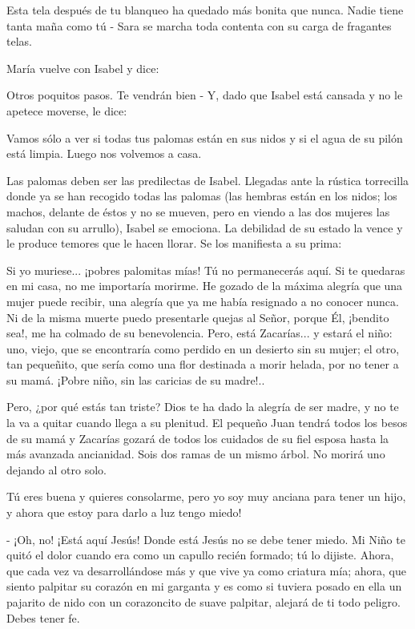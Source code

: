 \documentclass[12pt]{book} %
\begin{document}
Esta tela después de tu blanqueo ha quedado más bonita que nunca. Nadie tiene tanta maña como tú - Sara se marcha toda contenta con su carga de fragantes telas. 

María vuelve con Isabel y dice: 

Otros poquitos pasos. Te vendrán bien - Y, dado que Isabel está cansada y no le apetece moverse, le dice: 

Vamos sólo a ver si todas tus palomas están en sus nidos y si el agua de su pilón está limpia. Luego nos volvemos a casa. 

Las palomas deben ser las predilectas de Isabel. Llegadas ante la rústica torrecilla donde ya se han recogido todas las palomas (las hembras están en los nidos; los machos, delante de éstos y no se mueven, pero en viendo a las dos mujeres las saludan con su arrullo), Isabel se emociona. La debilidad de su estado la vence y le produce temores que le hacen llorar. Se los manifiesta a su prima: 

Si yo muriese... ¡pobres palomitas mías! Tú no permanecerás aquí. Si te quedaras en mi casa, no me importaría morirme. He gozado de la máxima alegría que una mujer puede recibir, una alegría que ya me había resignado a no conocer nunca. Ni de la misma muerte puedo presentarle quejas al Señor, porque Él, ¡bendito sea!, me ha colmado de su benevolencia. Pero, está Zacarías... y estará el niño: uno, viejo, que se encontraría como perdido en un desierto sin su mujer; el otro, tan pequeñito, que sería como una flor destinada a morir helada, por no tener a su mamá. ¡Pobre niño, sin las caricias de su madre!.. 

Pero, ¿por qué estás tan triste? Dios te ha dado la alegría de ser madre, y no te la va a quitar cuando llega a su plenitud. El pequeño Juan tendrá todos los besos de su mamá y Zacarías gozará de todos los cuidados de su fiel esposa hasta la más avanzada ancianidad. Sois dos ramas de un mismo árbol. No morirá uno dejando al otro solo. 

Tú eres buena y quieres consolarme, pero yo soy muy anciana para tener un hijo, y ahora que estoy para darlo a luz tengo miedo! 

- ¡Oh, no! ¡Está aquí Jesús! Donde está Jesús no se debe tener miedo. Mi Niño te quitó el dolor cuando era como un capullo recién formado; tú lo dijiste. Ahora, que cada vez va desarrollándose más y que vive ya como criatura mía; ahora, que siento palpitar su corazón en mi garganta y es como si tuviera posado en ella un pajarito de nido con un corazoncito de suave palpitar, alejará de ti todo peligro. Debes tener fe. 
\end{document}
